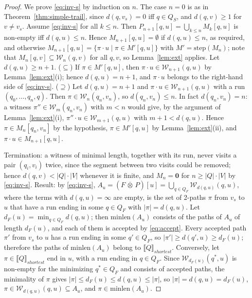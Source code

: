 \begin{proof}
	We prove \eqref{eq:inv-s} by induction on $n$. The case $n = 0$ is as in Theorem~\ref{thm:simple-trail}, since $d(q, v_s) = 0$ iff $q \in Q_S$, and $d(q, v) \geq 1$ for $v \neq v_s$.
	Assume \eqref{eq:inv-s} for all $k \leq n$. Then $P_{n+1}[q, u] = \bigcup_{k \leq n} M_k[q, u]$ is non-empty iff $d(q, u) \leq n$.
	Hence $M_{n+1}[q, u] = \emptyset$ if $d(q, u) \leq n$, as required, and otherwise $M_{n+1}[q, u] = \{ \pi \cdot u \mid \pi \in M'[q, u] \}$ with $M' = \mathrm{step}(M_n)$; note that $M_n[q, v] \subseteq \mathcal{W}_n(q, v)$ for all $q, v$, so Lemma~\ref{lem:ext} applies.
	Let $d(q, u) \geq n + 1$.
	($\subseteq$) If $\pi \in M'[q, u]$, then $\pi \cdot u \in \mathcal{W}_{n+1}(q, u)$ by Lemma~\ref{lem:ext}(i); hence $d(q, u) = n + 1$, and $\pi \cdot u$ belongs to the right-hand side of \eqref{eq:inv-s}.
	($\supseteq$) Let $d(q, u) = n + 1$ and $\pi \cdot u \in \mathcal{W}_{n+1}(q, u)$ with a run $(q_0, \ldots, q_n, q)$. Then $\pi \in \mathcal{W}_n(q_n, v_n)$, so $d(q_n, v_n) \leq n$. In fact $d(q_n, v_n) = n$: a witness $\pi'' \in \mathcal{W}_m(q_n, v_n)$ with $m < n$ would give, by the argument of Lemma~\ref{lem:ext}(i), $\pi'' \cdot u \in \mathcal{W}_{m+1}(q, u)$ with $m + 1 < d(q, u)$. Hence $\pi \in M_n[q_n, v_n]$ by the hypothesis, $\pi \in M'[q, u]$ by Lemma~\ref{lem:ext}(ii), and $\pi \cdot u \in M_{n+1}[q, u]$.

	Termination: a witness of minimal length, together with its run, never visits a pair $(q_i, v_i)$ twice, since the segment between two visits could be removed; hence $d(q, v) < |Q| \cdot |V|$ whenever it is finite, and $M_n = \mathbf{0}$ for $n \geq |Q| \cdot |V|$ by \eqref{eq:inv-s}.
	Result: by \eqref{eq:inv-s}, $A_u = (F \,\overline{\otimes}\, P)[u] = \bigcup_{q \in Q_F} \mathcal{W}_{d(q, u)}(q, u)$, where the terms with $d(q, u) = \infty$ are empty, is the set of 2-paths $\pi$ from $v_s$ to $u$ that have a run ending in some $q \in Q_F$ with $|\pi| = d(q, u)$.
	Let $d_F(u) = \min_{q \in Q_F} d(q, u)$; then $\mathrm{minlen}(A_u)$ consists of the paths of $A_u$ of length $d_F(u)$, and each of them is accepted by \eqref{eq:accept}.
	Every accepted path $\pi'$ from $v_s$ to $u$ has a run ending in some $q' \in Q_F$, so $|\pi'| \geq d(q', u) \geq d_F(u)$; therefore the paths of $\mathrm{minlen}(A_u)$ belong to $\llbracket Q \rrbracket_{shortest}$.
	Conversely, let $\pi \in \llbracket Q \rrbracket_{shortest}$ end in $u$, with a run ending in $q \in Q_F$. Since $\mathcal{W}_{d_F(u)}(q^*, u)$ is non-empty for the minimizing $q^* \in Q_F$ and consists of accepted paths, the minimality of $\pi$ gives $|\pi| \leq d_F(u) \leq d(q, u) \leq |\pi|$, so $|\pi| = d(q, u) = d_F(u)$, $\pi \in \mathcal{W}_{d(q,u)}(q, u) \subseteq A_u$, and $\pi \in \mathrm{minlen}(A_u)$.
\end{proof}

